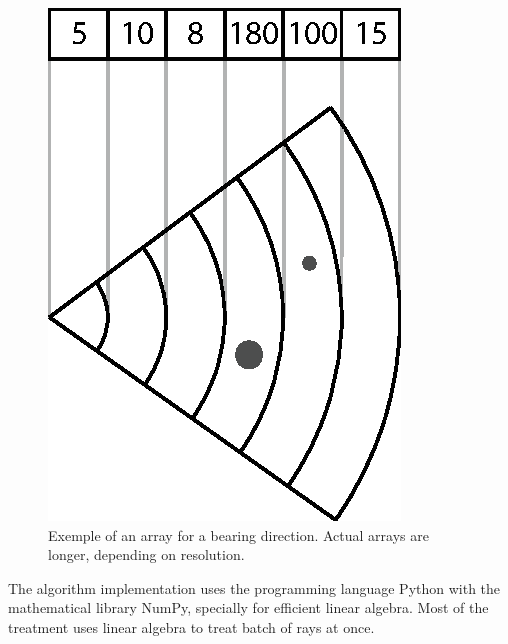 \begin{figure}[h]
	\centering
	\includegraphics[scale=1.,clip]{Chap2/fig/sonarresponse.eps}
	\caption{Exemple of an array for a bearing direction. Actual arrays are
	longer, depending on resolution.}
	\label{fig:bins}
\end{figure}

The algorithm implementation uses the programming language Python with the
mathematical library NumPy, specially for efficient linear algebra. Most of the
treatment uses linear algebra to treat batch of rays at once.

